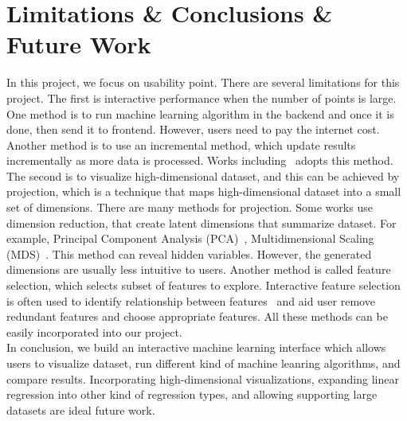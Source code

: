 \documentclass{article}
\begin{document}
\section{Limitations \& Conclusions \& Future Work}
In this project, we focus on usability point. There are several limitations for this project. The first is interactive performance when the number of points is large. One method is to run machine learning algorithm in the backend and once it is done, then send it to frontend.  However, users need to pay the internet cost.  Another method is to use an incremental method, which update results incrementally as more data is processed. Works including~\cite{crotty2015vizdom, fisher2012trust} adopts this method. \\
The second is to visualize high-dimensional dataset, and this can be achieved by projection, which is a technique that maps high-dimensional dataset into a small set of dimensions. There are many methods for projection. Some works use dimension reduction, that create latent dimensions that summarize dataset. For example, Principal Component Analysis (PCA)~\cite{jolliffe2002principal}, Multidimensional Scaling (MDS)~\cite{mead1992review}. This method can reveal hidden variables. However, the generated dimensions are usually less intuitive to users. Another method is called feature selection, which selects subset of features to explore. Interactive feature selection is often used to identify relationship between features~\cite{guo2003coordinating, yang2004value} and aid user remove redundant features and choose appropriate features. All these methods can be easily incorporated into our project.  \\
In conclusion, we build an interactive machine learning interface which allows users to visualize dataset, run different kind of machine leanring algorithms, and compare results. Incorporating high-dimensional visualizations, expanding linear regression into other kind of regression types, and allowing supporting large datasets are ideal future work.

\small


\end{document}
